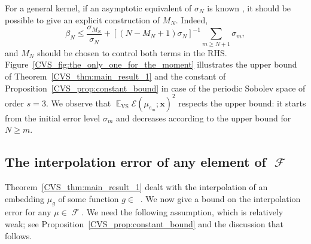 \documentclass[twoside,11pt]{book}
\newtheorem{theorem}{Theorem}
\numberwithin{theorem}{chapter}
\numberwithin{definition}{chapter}
\numberwithin{proposition}{chapter}
\numberwithin{corollary}{chapter}
\numberwithin{example}{chapter}
\numberwithin{lemma}{chapter}
\DeclareMathOperator{\VS}{\mathrm{VS}}
\DeclareMathOperator{\EX}{\mathbb{E}}
\DeclareMathOperator{\F}{\mathcal{F}}
\DeclareMathOperator{\Ltwo}{\mathbb{L}_{2}(\mathrm{d} \omega)}
\newcommand{\pc}[1]{\textcolor{blue}{#1}}
\begin{document}
 For a general kernel, if an asymptotic equivalent of $\sigma_{N}$ is known \citep{Wid63,Wid64}, it should be possible to give an explicit construction of $M_N$. Indeed,
\begin{equation}
 \beta_{N} \leq \frac{\sigma_{M_{N}}}{\sigma_{N}} + [{(N-M_{N}+1)\sigma_{N}}]^{-1} \sum\limits_{m \geq N+1}\sigma_{m},
\end{equation}
and $M_{N}$ should be chosen to control both terms in the RHS.
%
Figure~\ref{CVS_fig:the_only_one_for_the_moment} illustrates the upper bound of Theorem~\ref{CVS_thm:main_result_1} and the constant of Proposition~\ref{CVS_prop:constant_bound} in case of the periodic Sobolev space of order $s=3$. We observe that $\EX_{\VS} \mathcal{E}(\mu_{e_m};\bm{x})^{2}$ respects the upper bound: it starts from the initial error level $\sigma_m$ and decreases according to the upper bound for $N \geq m$.




\subsection{The interpolation error of any element of $\F$}\label{CVS_sec:main_theorems_2}
%
%
Theorem~\ref{CVS_thm:main_result_1} dealt with the interpolation of an embedding $\mu_{g}$ of some function $g\in\Ltwo$. We now give a bound on the interpolation error for any $\mu\in\F$. We need the following assumption, which is relatively weak; see Proposition~\ref{CVS_prop:constant_bound} and the discussion that follows.
\end{document}
